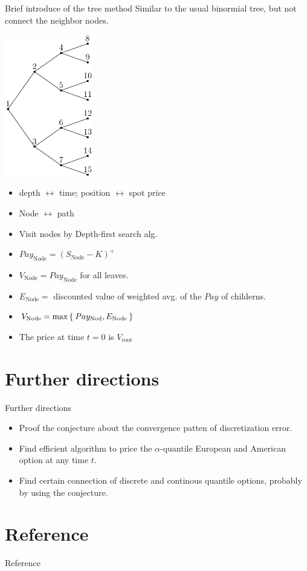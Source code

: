 \documentclass[cjk,10pt]{beamer}
\begin{document}
\begin{frame}{Brief introduce of the tree method}
Similar to the usual binormial tree, but not connect the neighbor nodes.

\includegraphics[width=0.29\textwidth]{bitree.pdf}
\parbox[b]{0.7\textwidth}{
\begin{itemize}
\item depth $\leftrightarrow$ time; position $\leftrightarrow$ spot price 
\item Node $\leftrightarrow$ path 
\item Visit nodes by Depth-first search alg.
\item $Pay_{\text{Node}} = (S_{\text{Node}}-K)^+$
\item $V_{\text{Node}} = Pay_{\text{Node}}$ for all leaves.
\item $E_{\text{Node}} =$ discounted value of weighted avg. of 
  the $Pay$ of childerns.
\item $V_{\text{Node}} = \max\Set{Pay_{\text{Nod}}, E_{\text{Node}}} $
\item The price at time $t=0$ is $V_{\text{root}}$
\end{itemize}
}
\end{frame}

\section{Further directions}
\begin{frame}{Further directions}
\begin{itemize}
\item Proof the conjecture about the convergence patten of discretization error. 
\item Find efficient algorithm to price 
  the $\alpha$-quantile European and American option at any time $t$. 
\item Find certain connection of discrete and continous quantile options, 
  probably by using the conjecture. 
\end{itemize}
\end{frame}

\section{Reference}
\begin{frame}[allowframebreaks]{Reference}

\end{frame}
\end{document}
